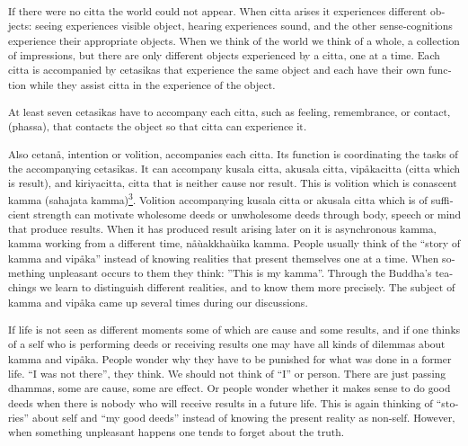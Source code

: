 \textsuperscript{\textdutch{If there were no citta the world could not
appear. When citta arises it experiences different objects: seeing
experiences visible object, hearing experiences sound, and the other
sense-cognitions experience their appropriate objects. When we think of
the world we think of a whole, a collection of impressions, but there
are only different objects experienced by a citta, one at a time. Each
citta is accompanied by cetasikas that experience the same object and
each have their own function while they assist citta in the experience
of the object. }}

\textsuperscript{\textdutch{At least seven cetasikas have to accompany
each citta, such as feeling, remembrance, or contact,(phassa), that
contacts the object so that citta can experience it. }}

\textsuperscript{\textdutch{Also cetanå, intention or volition,
accompanies each citta. Its function is coordinating the tasks of the
accompanying cetasikas. It can accompany kusala citta, akusala citta,
vipåkacitta (}\textenglish[variant=american]{citta which is
result}\textdutch{)},\textdutch{ and kiriyacitta, citta that is neither
cause nor result. This is volition which is conascent kamma (sahajata
kamma)\protect\hyperlink{sdfootnote3sym}{\textsuperscript{3}}. Volition
accompanying kusala citta or akusala citta which is of sufficient
strength can motivate wholesome deeds or unwholesome deeds through body,
speech or mind that produce results. When it has produced result arising
later on it is asynchronous kamma, kamma working from a different time,
}n\textitalian{åù}akkha\textitalian{ù}ika\textdutch{ kamma. People
usually think of the ``story of kamma and vipåka'' instead of knowing
realities that present themselves one at a time. When something
unpleasant occurs to them they think: ''This is my kamma''. Through the
Buddha's teachings we learn to distinguish different realities, and to
know them more precisely. The subject of kamma and vipåka came up
several times during our discussions. }}

\textsuperscript{\textdutch{If life is not seen as different moments
some of which are cause and some results, and if one thinks of a self
who is performing deeds or receiving results one may have all kinds of
dilemmas about kamma and vipåka. People wonder why they have to be
punished for what was done in a former life.
``}\textenglish[variant=american]{I was not
there}\textdutch{''}\textenglish[variant=american]{, they think.
}\textdutch{We should}\textenglish[variant=american]{ not think of
}``I'' or person. \textdutch{There are
j}\textenglish[variant=american]{ust passing dhammas, some are cause,
some are effect.}\textdutch{ Or people wonder whether it makes sense to
do good deeds when there is nobody who will receive results in a future
life. This is again thinking of ``stories'' about self and ``my good
deeds'' instead of knowing the present reality as non-self. However,
when something unpleasant happens one tends to forget about the truth.
}}

